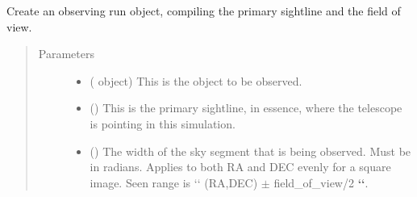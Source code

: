 \documentclass[letterpaper,10pt,english]{sphinxmanual}
\begin{document}
\begin{fulllineitems}
\begin{fulllineitems}
Create an observing run object, compiling the primary sightline and
the field of view.
\begin{quote}\begin{description}
\item[{Parameters}] \leavevmode\begin{itemize}
\item {} 
 ({\hyperref[\detokenize{model_observing:model_observing.ProtostarModel}]{}} object) \textendash{} This is the object to be observed.

\item {} 
 () \textendash{} This is the primary sightline, in essence, where the telescope
is pointing in this simulation.

\item {} 
 () \textendash{} The width of the sky segment that is being observed. Must be in
radians. Applies to both RA and DEC evenly for a square image.
Seen range is {}`{}` (RA,DEC) \(\pm\) field\_of\_view/2 {\color{red}\bfseries{}{}`{}`}.

\end{itemize}

\end{description}\end{quote}

\end{fulllineitems}


\end{fulllineitems}

\end{document}
